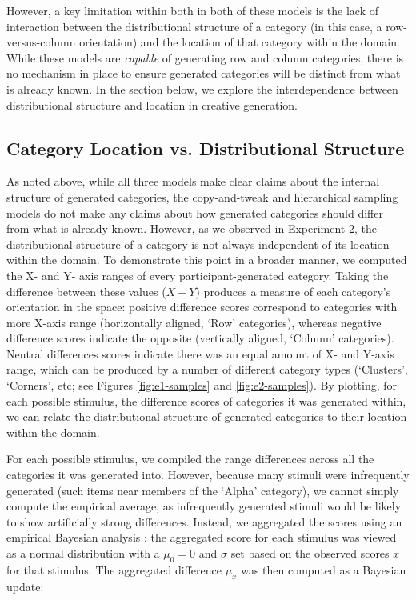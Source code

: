 \documentclass[12pt]{article}
\begin{document}
\begin{flushleft}
However, a key limitation within both in both of these models is the lack of interaction between the distributional structure of a category (in this case, a row-versus-column orientation) and the location of that category within the domain. While these models are \textit{capable} of generating row and column categories, there is no mechanism in place to ensure generated categories will be distinct from what is already known. In the section below, we explore the interdependence between distributional structure and location in creative generation.

\subsection{Category Location vs. Distributional Structure}

As noted above, while all three models make clear claims about the internal structure of generated categories, the copy-and-tweak and hierarchical sampling models do not make any claims about how generated categories should differ from what is already known. However, as we observed in Experiment 2, the distributional structure of a category is not always independent of its location within the domain. To demonstrate this point in a broader manner, we computed the X- and Y- axis ranges of every participant-generated category. Taking the difference between these values ($X-Y$) produces a measure of each category's orientation in the space: positive difference scores correspond to categories with more X-axis range (horizontally aligned, `Row' categories), whereas negative difference scores indicate the opposite (vertically aligned, `Column' categories). Neutral differences scores indicate there was an equal amount of X- and Y-axis range, which can be produced by a number of different category types (`Clusters', `Corners', etc; see Figures \ref{fig:e1-samples} and \ref{fig:e2-samples}). By plotting, for each possible stimulus, the difference scores of categories it was generated within, we can relate the distributional structure of generated categories to their location within the domain.

For each possible stimulus, we compiled the range differences across all the categories it was generated into. However, because many stimuli were infrequently generated (such items near members of the `Alpha' category), we cannot simply compute the empirical average, as infrequently generated stimuli would be likely to show artificially strong differences. Instead, we aggregated the scores using an empirical Bayesian analysis \citep{robbins1964empirical}: the aggregated score for each stimulus was viewed as a normal distribution with a $\mu_0 = 0$ and $\sigma$ set based on the observed scores $x$ for that stimulus. The aggregated difference $\mu_x$ was then computed as a Bayesian update: 


\end{flushleft}
\end{document}

